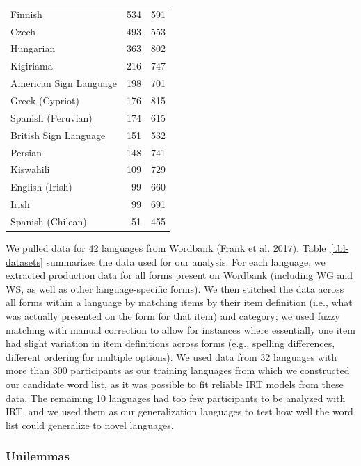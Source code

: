 \documentclass[
  letterpaper,
  DIV=11,
  numbers=noendperiod]{scrartcl}
\begin{document}
\begin{table}
{\begin{tabular*}{225pt}{@{\extracolsep{\fill}}lrr}
Finnish & 534 & 591 \\ 
Czech & 493 & 553 \\ 
Hungarian & 363 & 802 \\ 
\midrule
{Kigiriama} & {216} & {747} \\ 
American Sign Language & 198 & 701 \\ 
Greek (Cypriot) & 176 & 815 \\ 
Spanish (Peruvian) & 174 & 615 \\ 
British Sign Language & 151 & 532 \\ 
Persian & 148 & 741 \\ 
Kiswahili & 109 & 729 \\ 
English (Irish) & 99 & 660 \\ 
Irish & 99 & 691 \\ 
Spanish (Chilean) & 51 & 455 \\ 
\bottomrule
\end{tabular*}

}

\end{table}%

We pulled data for 42 languages from Wordbank (Frank et al. 2017).
Table~\ref{tbl-datasets} summarizes the data used for our analysis. For
each language, we extracted production data for all forms present on
Wordbank (including WG and WS, as well as other language-specific
forms). We then stitched the data across all forms within a language by
matching items by their item definition (i.e., what was actually
presented on the form for that item) and category; we used fuzzy
matching with manual correction to allow for instances where essentially
one item had slight variation in item definitions across forms (e.g.,
spelling differences, different ordering for multiple options). We used
data from 32 languages with more than 300 participants as our training
languages from which we constructed our candidate word list, as it was
possible to fit reliable IRT models from these data. The remaining 10
languages had too few participants to be analyzed with IRT, and we used
them as our generalization languages to test how well the word list
could generalize to novel languages.

\subsubsection{Unilemmas}\label{unilemmas}
\end{document}
